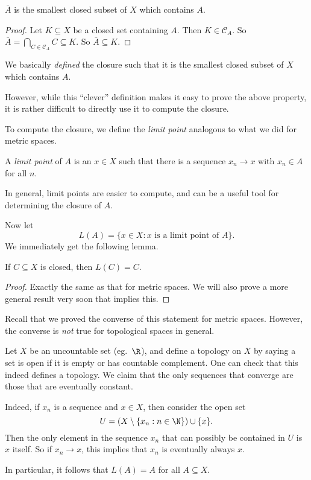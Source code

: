 \documentclass[a4paper]{article}
\begin{document}
\begin{prop}
  $\bar A$ is the smallest closed subset of $X$ which contains $A$.
\end{prop}

\begin{proof}
  Let $K\subseteq X$ be a closed set containing $A$. Then $K\in \mathcal{C}_A$. So $\bar A = \bigcap_{C\in \mathcal{C}_A}C \subseteq K$. So $\bar A\subseteq K$.
\end{proof}

We basically \emph{defined} the closure such that it is the smallest closed subset of $X$ which contains $A$.

However, while this ``clever'' definition makes it easy to prove the above property, it is rather difficult to directly use it to compute the closure.

To compute the closure, we define the \emph{limit point} analogous to what we did for metric spaces.
\begin{defi}
  A \emph{limit point} of $A$ is an $x\in X$ such that there is a sequence $x_n \to x$ with $x_n \in A$ for all $n$.
\end{defi}
In general, limit points are easier to compute, and can be a useful tool for determining the closure of $A$.

Now let
\[
  L(A) = \{x\in X: x\text{ is a limit point of }A\}.
\]
We immediately get the following lemma.
\begin{lemma}
  If $C\subseteq X$ is closed, then $L(C) = C$.
\end{lemma}

\begin{proof}
  Exactly the same as that for metric spaces. We will also prove a more general result very soon that implies this.
\end{proof}

Recall that we proved the converse of this statement for metric spaces. However, the converse is \emph{not} true for topological spaces in general.

\begin{eg}
  Let $X$ be an uncountable set (eg.\ $\R$), and define a topology on $X$ by saying a set is open if it is empty or has countable complement. One can check that this indeed defines a topology. We claim that the only sequences that converge are those that are eventually constant.

  Indeed, if $x_n$ is a sequence and $x \in X$, then consider the open set
  \[
    U = (X \setminus \{x_n: n \in \N\}) \cup \{x\}.
  \]
  Then the only element in the sequence $x_n$ that can possibly be contained in $U$ is $x$ itself. So if $x_n \to x$, this implies that $x_n$ is eventually always $x$.

  In particular, it follows that $L(A) = A$ for all $A \subseteq X$.
\end{eg}
\end{document}
